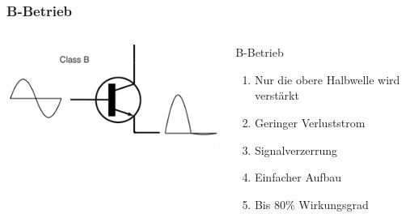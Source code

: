 \begin{frame}
    \frametitle{B-Betrieb}
            \begin{columns}[c]
        \begin{center}
            \includegraphics[width=1\textwidth,height=.8\textheight,keepaspectratio]{a07/Electronic_Amplifier_Class_B_fixed.png}\\
	    {\tiny \hyperlink{refs}{\cite{wm}}}
    \end{center}
    \begin{block}{B-Betrieb}
	    \begin{enumerate} 
			\item Nur die obere Halbwelle wird verstärkt
			\item Geringer Verluststrom
			\item Signalverzerrung
			\item Einfacher Aufbau
			\item Bis $80\%$ Wirkungsgrad
    	\end{enumerate}
    \end{block}
    \end{columns}
\end{frame}

